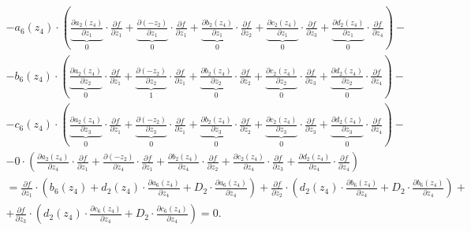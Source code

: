 \documentclass{article}
\begin{document}
\begin{equation*}
\begin{gathered}
  \\ - a_{6}(z_{4}) \cdot (\underbrace{\frac{\partial a_{2}(z_{4})}{\partial z_{1}}}_{0} \cdot \frac{\partial f}{\partial z_{1}}
   + \underbrace{\frac{\partial (-z_{2})}{\partial z_{1}}}_{0} \cdot \frac{\partial f}{\partial z_{1}}
    + \underbrace{\frac{\partial b_{2}(z_{4})}{\partial z_{1}}}_{0} \cdot \frac{\partial f}{\partial z_{2}}
    + \underbrace{\frac{\partial c_{2}(z_{4})}{\partial z_{1}}}_{0} \cdot \frac{\partial f}{\partial z_{3}}
     + \underbrace{\frac{\partial d_{2}(z_{4})}{\partial z_{1}}}_{0} \cdot \frac{\partial f}{\partial z_{4}}) -
  \\ - b_{6}(z_{4}) \cdot (\underbrace{\frac{\partial a_{2}(z_{4})}{\partial z_{2}}}_{0} \cdot \frac{\partial f}{\partial z_{1}}
   + \underbrace{\frac{\partial (-z_{2})}{\partial z_{2}}}_{1} \cdot \frac{\partial f}{\partial z_{1}}
    + \underbrace{\frac{\partial b_{2}(z_{4})}{\partial z_{2}}}_{0} \cdot \frac{\partial f}{\partial z_{2}}
     + \underbrace{\frac{\partial c_{2}(z_{4})}{\partial z_{2}}}_{0} \cdot \frac{\partial f}{\partial z_{3}}
      + \underbrace{\frac{\partial d_{2}(z_{4})}{\partial z_{2}}}_{0} \cdot \frac{\partial f}{\partial z_{4}}) -
  \\ - c_{6}(z_{4}) \cdot (\underbrace{\frac{\partial a_{2}(z_{4})}{\partial z_{3}}}_{0} \cdot \frac{\partial f}{\partial z_{1}}
    + \underbrace{\frac{\partial (-z_{2})}{\partial z_{3}}}_{0} \cdot \frac{\partial f}{\partial z_{1}}
     + \underbrace{\frac{\partial b_{2}(z_{4})}{\partial z_{3}}}_{0} \cdot \frac{\partial f}{\partial z_{2}}
      + \underbrace{\frac{\partial c_{2}(z_{4})}{\partial z_{3}}}_{0} \cdot \frac{\partial f}{\partial z_{3}}
       + \underbrace{\frac{\partial d_{2}(z_{4})}{\partial z_{3}}}_{0} \cdot \frac{\partial f}{\partial z_{4}}) -
  \\ - 0 \cdot (\frac{\partial a_{2}(z_{4})}{\partial z_{4}} \cdot \frac{\partial f}{\partial z_{1}}
   + \frac{\partial (-z_{2})}{\partial z_{4}} \cdot \frac{\partial f}{\partial z_{1}}
    + \frac{\partial b_{2}(z_{4})}{\partial z_{4}} \cdot \frac{\partial f}{\partial z_{2}}
     + \frac{\partial c_{2}(z_{4})}{\partial z_{4}} \cdot \frac{\partial f}{\partial z_{3}}
     + \frac{\partial d_{2}(z_{4})}{\partial z_{4}} \cdot \frac{\partial f}{\partial z_{4}})
     \\ = \frac{\partial f}{\partial z_{1}} \cdot (b_{6}(z_{4}) + d_{2}(z_{4}) \cdot \frac{\partial a_{6}(z_{4})}{\partial z_{4}} + D_{2} \cdot \frac{\partial a_{6}(z_{4})}{\partial z_{4}})
      + \frac{\partial f}{\partial z_{2}} \cdot (d_{2}(z_{4}) \cdot \frac{\partial b_{6}(z_{4})}{\partial z_{4}} + D_{2} \cdot \frac{\partial b_{6}(z_{4})}{\partial z_{4}}) +
      \\ + \frac{\partial f}{\partial z_{3}} \cdot (d_{2}(z_{4}) \cdot \frac{\partial c_{6}(z_{4})}{\partial z_{4}} + D_{2} \cdot \frac{\partial c_{6}(z_{4})}{\partial z_{4}}) = 0.
    \end{gathered}
\end{equation*}
\end{document}
